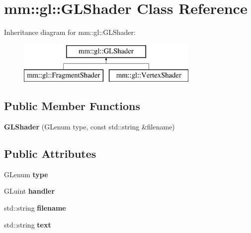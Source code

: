 \hypertarget{classmm_1_1gl_1_1_g_l_shader}{}\section{mm\+:\+:gl\+:\+:G\+L\+Shader Class Reference}
\label{classmm_1_1gl_1_1_g_l_shader}
Inheritance diagram for mm\+:\+:gl\+:\+:G\+L\+Shader\+:\begin{figure}[H]
\begin{center}
\leavevmode
\includegraphics[height=2.000000cm]{classmm_1_1gl_1_1_g_l_shader}
\end{center}
\end{figure}
\subsection*{Public Member Functions}
\begin{DoxyCompactItemize}
\item 
\hypertarget{classmm_1_1gl_1_1_g_l_shader_a501cdad1fd1ce401dd40e87948b77d0d}{}{\bfseries G\+L\+Shader} (G\+Lenum type, const std\+::string \&filename)\label{classmm_1_1gl_1_1_g_l_shader_a501cdad1fd1ce401dd40e87948b77d0d}

\end{DoxyCompactItemize}
\subsection*{Public Attributes}
\begin{DoxyCompactItemize}
\item 
\hypertarget{classmm_1_1gl_1_1_g_l_shader_a99006821270e31a175bdfdb64f8f4217}{}G\+Lenum {\bfseries type}\label{classmm_1_1gl_1_1_g_l_shader_a99006821270e31a175bdfdb64f8f4217}

\item 
\hypertarget{classmm_1_1gl_1_1_g_l_shader_a33a3daec2995fd4f5df49d3d439da9fc}{}G\+Luint {\bfseries handler}\label{classmm_1_1gl_1_1_g_l_shader_a33a3daec2995fd4f5df49d3d439da9fc}

\item 
\hypertarget{classmm_1_1gl_1_1_g_l_shader_a0603b8f2a31d170f53328a547cdd1bec}{}std\+::string {\bfseries filename}\label{classmm_1_1gl_1_1_g_l_shader_a0603b8f2a31d170f53328a547cdd1bec}

\item 
\hypertarget{classmm_1_1gl_1_1_g_l_shader_af4f25142b975eb2e1512738e343939c9}{}std\+::string {\bfseries text}\label{classmm_1_1gl_1_1_g_l_shader_af4f25142b975eb2e1512738e343939c9}

\end{DoxyCompactItemize}
